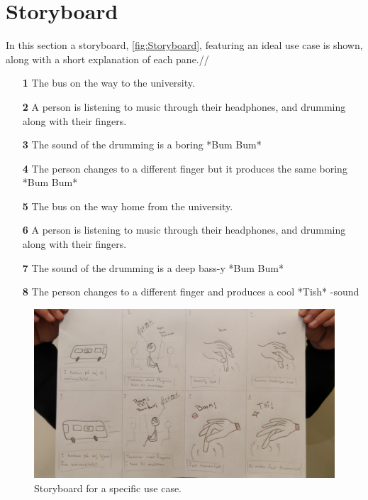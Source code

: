 \section{Storyboard}
\label{storyboard}

In this section a storyboard, \autoref{fig:Storyboard}, featuring an ideal use case is shown, along with a short explanation of each pane.//

\begin{enumerate}
\item[\textbf{1}] The bus on the way to the university. 
\item[\textbf{2}] A person is listening to music through their headphones, and drumming along with their fingers.
\item[\textbf{3}] The sound of the drumming is a boring *Bum Bum*
\item[\textbf{4}] The person changes to a different finger but it produces the same boring *Bum Bum*
\item[\textbf{5}] The bus on the way home from the university. 
\item[\textbf{6}] A person is listening to music through their headphones, and drumming along with their fingers.
\item[\textbf{7}] The sound of the drumming is a deep bass-y *Bum Bum*
\item[\textbf{8}] The person changes to a different finger and produces a cool *Tish* -sound
\end{enumerate}


\begin{figure}[H]
\centering
\includegraphics[width = \textwidth]{Figure/Billeder/IMG_20171114_121225.jpg}
\caption{Storyboard for a specific use case.}
\label{fig:Storyboard}
\end{figure}